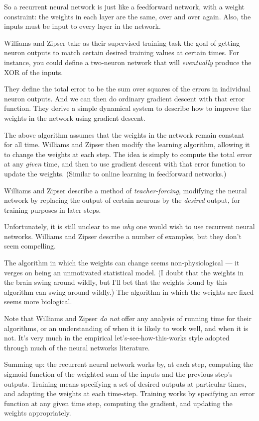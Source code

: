 \documentclass[12pt]{article}
\begin{document}
So a recurrent neural network is just like a feedforward network, with
a weight constraint: the weights in each layer are the same, over and
over again.  Also, the inputs must be input to every layer in the
network.
  
Williams and Zipser take as their supervised training task the goal of
getting neuron outputs to match certain desired training values at
certain times.  For instance, you could define a two-neuron network
that will \emph{eventually} produce the XOR of the inputs.
  
They define the total error to be the sum over squares of the errors
in individual neuron outputs.  And we can then do ordinary gradient
descent with that error function.  They derive a simple dynamical
system to describe how to improve the weights in the network using
gradient descent.

The above algorithm assumes that the weights in the network remain
constant for all time.  Williams and Zipser then modify the learning
algorithm, allowing it to change the weights at each step.  The idea
is simply to compute the total error at any \emph{given} time, and
then to use gradient descent with that error function to update the
weights.  (Similar to online learning in feedforward networks.)
  
Williams and Zipser describe a method of \emph{teacher-forcing},
modifying the neural network by replacing the output of certain
neurons by the \emph{desired} output, for training purposes in later
steps.
  
Unfortunately, it is still unclear to me \emph{why} one would wish to
use recurrent neural networks.  Williams and Zipser describe a number
of examples, but they don't seem compelling.

The algorithm in which the weights can change seems non-physiological
--- it verges on being an unmotivated statistical model.  (I doubt
that the weights in the brain swing around wildly, but I'll bet that
the weights found by this algorithm can swing around wildly.)  The
algorithm in which the weights are fixed seems more biological.
  
Note that Williams and Zipser \emph{do not} offer any analysis of
running time for their algorithms, or an understanding of when it is
likely to work well, and when it is not.  It's very much in the
empirical let's-see-how-this-works style adopted through much of the
neural networks literature.
  
Summing up: the recurrent neural network works by, at each step,
computing the sigmoid function of the weighted sum of the inputs and
the previous step's outputs.  Training means specifying a set of
desired outputs at particular times, and adapting the weights at each
time-step.  Training works by specifying an error function at any
given time step, computing the gradient, and updating the weights
appropriately.
\end{document}
